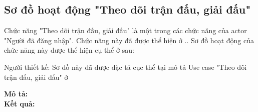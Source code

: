 \subsection{Sơ đồ hoạt động "Theo dõi trận đấu, giải đấu"}
\setcounter{figure}{0}

Chức năng "Theo dõi trận đấu, giải đấu" là một trong các chức năng của actor
"Người đã đăng nhập". Chức năng này đã được thể hiện ở ..
Sơ đồ hoạt động của chức năng này được thể hiện cụ thể ở \myref{} sau:

Người thiết kế:
Sơ đồ này đã được đặc tả cục thể tại mô tả Use case "Theo dõi trận đấu, giải đấu"
ở 


\noindent
\textbf{Mô tả:}\\

\noindent
\textbf{Kết quả:}


